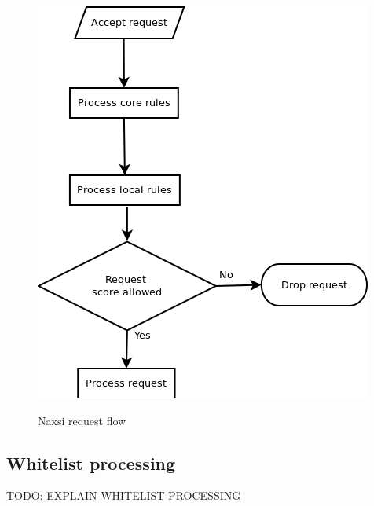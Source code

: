 \documentclass[Naxsi]{subfiles}
\begin{document}
\begin{figure}[h]
\caption{Naxsi request flow}
\centering
\includegraphics[scale=0.3] {images/naxsi_flow.png}
\label{fig:naxsi_flow}
\end{figure}

\subsection{Whitelist processing}
\label{sec:naxsi_whitelist}
TODO: EXPLAIN WHITELIST PROCESSING
\end{document}

